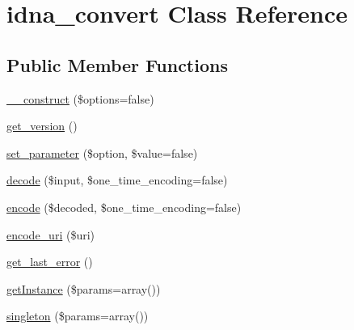 \hypertarget{classidna__convert}{}\section{idna\+\_\+convert Class Reference}
\label{classidna__convert}
\subsection*{Public Member Functions}
\begin{DoxyCompactItemize}
\item 
\hyperlink{classidna__convert_a41c710240381df950f03e3a7e4648a1e}{\+\_\+\+\_\+construct} (\$options=false)
\item 
\hyperlink{classidna__convert_a59d30af851a16b87ac00a96931fe7e61}{get\+\_\+version} ()
\item 
\hyperlink{classidna__convert_a1efc37a8bd5f6b08eed75e0b8e6f074d}{set\+\_\+parameter} (\$option, \$value=false)
\item 
\hyperlink{classidna__convert_a845094b11b91976cea00bd9b9e022cd5}{decode} (\$input, \$one\+\_\+time\+\_\+encoding=false)
\item 
\hyperlink{classidna__convert_ae6e83c86d02d1ad9b8a7eb48435863bd}{encode} (\$decoded, \$one\+\_\+time\+\_\+encoding=false)
\item 
\hyperlink{classidna__convert_a21b3f0bb158b689c9d835bb1c7a30114}{encode\+\_\+uri} (\$uri)
\item 
\hyperlink{classidna__convert_adcf7a0902a83a834ce05fc34a460fccd}{get\+\_\+last\+\_\+error} ()
\item 
\hyperlink{classidna__convert_aff2ec039994038d13c8000addff58de3}{get\+Instance} (\$params=array())
\item 
\hyperlink{classidna__convert_a899f287645e43d1fd44a627cdb6b0e79}{singleton} (\$params=array())
\end{DoxyCompactItemize}
